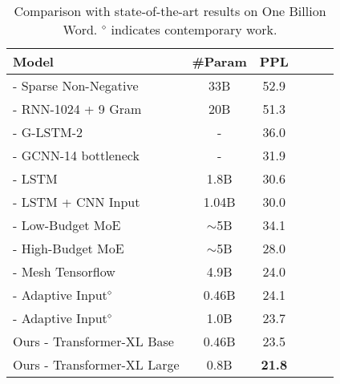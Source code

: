 \documentclass[11pt,a4paper]{article}
\begin{document}
\bgroup
\setlength{\tabcolsep}{2pt}
\begin{table}[t]
	\small
	\centering
	\begin{adjustwidth}{-4pt}{}
		
	\begin{tabular}{l|ccccc}
		\toprule
		\bf Model & \bf \#Param & \bf PPL \\
		\midrule
		\citet{shazeer2014skip} - Sparse Non-Negative & 33B & 52.9 \\
		\citet{chelba2013one} - RNN-1024 + 9 Gram & 20B & 51.3 \\
\citet{kuchaiev2017factorization} - G-LSTM-2 & - & 36.0 \\
		\citet{dauphin2016language} - GCNN-14 bottleneck & - & 31.9 \\
		\citet{jozefowicz2016exploring} - LSTM & 1.8B & 30.6 \\
		\citet{jozefowicz2016exploring} - LSTM + CNN Input & 1.04B & 30.0 \\
		\citet{shazeer2017outrageously} - Low-Budget MoE & $\sim$5B & 34.1 \\
		\citet{shazeer2017outrageously} - High-Budget MoE & $\sim$5B & 28.0 \\
\citet{shazeer2018mesh} - Mesh Tensorflow & 4.9B & 24.0 \\
		\citet{baevski2018adaptive} - Adaptive Input$^\diamond$ & 0.46B & 24.1 \\
		\citet{baevski2018adaptive} - Adaptive Input$^\diamond$ & 1.0B & 23.7 \\
		\midrule
		Ours - Transformer-XL Base & 0.46B & 23.5 \\
		Ours - Transformer-XL Large & 0.8B & \textbf{21.8} \\
		\bottomrule
	\end{tabular}
	\caption{\small
		Comparison with state-of-the-art results on One Billion Word. $^\diamond$ indicates contemporary work.
	}
	\label{table:lm1b}
	\end{adjustwidth}
\end{table}
\end{document}
